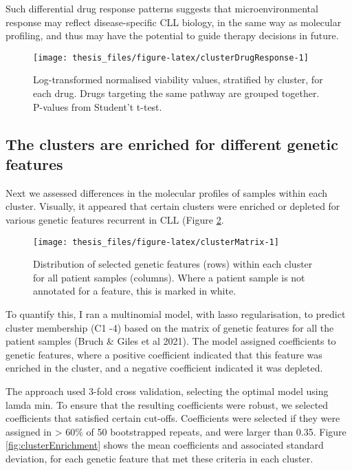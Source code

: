\documentclass[11pt, a4paper, twosided]{book}
\begin{document}
Such differential drug response patterns suggests that microenvironmental response may reflect disease-specific CLL biology, in the same way as molecular profiling, and thus may have the potential to guide therapy decisions in future.


\begin{figure}

{\centering \texttt{[image: thesis\_files/figure-latex/clusterDrugResponse-1]} 

}

\caption{Log-transformed normalised viability values, stratified by cluster, for each drug. Drugs targeting the same pathway are grouped together. P-values from Student't t-test.}\label{fig:clusterDrugResponse}
\end{figure}
\hypertarget{the-clusters-are-enriched-for-different-genetic-features}{%
\subsection{The clusters are enriched for different genetic features}\label{the-clusters-are-enriched-for-different-genetic-features}}

Next we assessed differences in the molecular profiles of samples within each cluster. Visually, it appeared that certain clusters were enriched or depleted for various genetic features recurrent in CLL (Figure \ref{fig:clusterMatrix}.


\begin{figure}

{\centering \texttt{[image: thesis\_files/figure-latex/clusterMatrix-1]} 

}

\caption{Distribution of selected genetic features (rows) within each cluster for all patient samples (columns). Where a patient sample is not annotated for a feature, this is marked in white.}\label{fig:clusterMatrix}
\end{figure}
To quantify this, I ran a multinomial model, with lasso regularisation, to predict cluster membership (C1 -4) based on the matrix of genetic features for all the patient samples (Bruch \& Giles et al 2021). The model assigned coefficients to genetic features, where a positive coefficient indicated that this feature was enriched in the cluster, and a negative coefficient indicated it was depleted.

The approach used 3-fold cross validation, selecting the optimal model using lamda min. To ensure that the resulting coefficients were robust, we selected coefficients that satisfied certain cut-offs. Coefficients were selected if they were assigned in \textgreater{} 60\% of 50 bootstrapped repeats, and were larger than 0.35. Figure \ref{fig:clusterEnrichment} shows the mean coefficients and associated standard deviation, for each genetic feature that met these criteria in each cluster.
\end{document}
